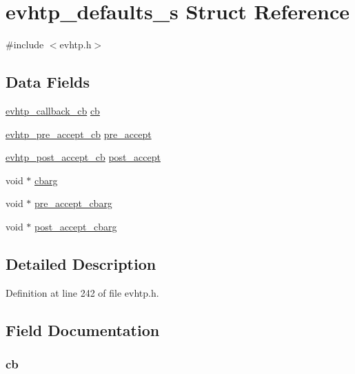 \hypertarget{structevhtp__defaults__s}{\section{evhtp\-\_\-defaults\-\_\-s \-Struct \-Reference}
\label{structevhtp__defaults__s}
}


{\ttfamily \#include $<$evhtp.\-h$>$}

\subsection*{\-Data \-Fields}
\begin{DoxyCompactItemize}
\item 
\hyperlink{evhtp_8h_ae907dbe36b762aa2da912cedb57268d0}{evhtp\-\_\-callback\-\_\-cb} \hyperlink{structevhtp__defaults__s_a783ee29046d4ff3e8c75f811e80fd57b}{cb}
\item 
\hyperlink{evhtp_8h_a3d11ad751c4ad23fd50542e7c75364ff}{evhtp\-\_\-pre\-\_\-accept\-\_\-cb} \hyperlink{structevhtp__defaults__s_a479402c7d67e5e23cb7e9a3262b6b707}{pre\-\_\-accept}
\item 
\hyperlink{evhtp_8h_a1fbba02d0b28d101592e5509703eddff}{evhtp\-\_\-post\-\_\-accept\-\_\-cb} \hyperlink{structevhtp__defaults__s_a0b645f2619a137a4e299e28c1fe208a8}{post\-\_\-accept}
\item 
void $\ast$ \hyperlink{structevhtp__defaults__s_aafd3d1a6343925cb274875556a6faa0e}{cbarg}
\item 
void $\ast$ \hyperlink{structevhtp__defaults__s_a0f92afb003b402ad524c0a95d13b4fb7}{pre\-\_\-accept\-\_\-cbarg}
\item 
void $\ast$ \hyperlink{structevhtp__defaults__s_a44bb35b51726d7c4e775a347b3dbc3f0}{post\-\_\-accept\-\_\-cbarg}
\end{DoxyCompactItemize}


\subsection{\-Detailed \-Description}


\-Definition at line 242 of file evhtp.\-h.



\subsection{\-Field \-Documentation}
\hypertarget{structevhtp__defaults__s_a783ee29046d4ff3e8c75f811e80fd57b}{
\subsubsection[{cb}]{ {\bf cb}}}\label{structevhtp__defaults__s_a783ee29046d4ff3e8c75f811e80fd57b}


